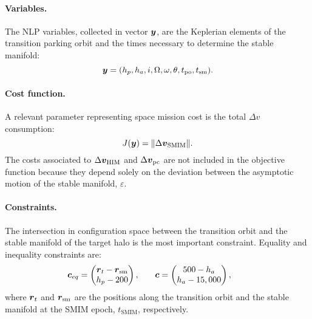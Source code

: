 \paragraph{Variables.}The {NLP} variables, collected in vector $\boldsymbol{y}$, are the Keplerian elements of the transition parking orbit and the times necessary to determine the stable manifold:
%
\begin{equation}
\boldsymbol{y} = (h_p,h_a,i,\Omega,\omega,\theta,t_{\textrm{po}},t_{\textrm{sm}}).
\end{equation}
%

\paragraph{Cost function.} A relevant parameter representing space mission cost is the total $\Delta v$ consumption:
%
\begin{equation}
J(\boldsymbol{y}) = \|\Delta\boldsymbol{v}_{\textrm{SMIM}}\|.
\end{equation}
%
The costs associated to $\Delta\boldsymbol{v}_{\textrm{HIM}}$ and $\Delta\boldsymbol{v}_{\textrm{pc}}$ are not included in the objective function because they depend solely on the deviation between the asymptotic motion of the stable manifold, \ie $\varepsilon$.

\paragraph{Constraints.} 
The intersection in configuration space between the transition orbit and the stable manifold of the target halo is the most important constraint. Equality and inequality constraints are:
%
\begin{align}
&\begin{aligned}
\boldsymbol{c}_{eq} &= \begin{pmatrix}
\boldsymbol{r}_t-\boldsymbol{r}_{\textrm{sm}} \\
h_p-200
\end{pmatrix},
\end{aligned}
&
&\begin{aligned}
\boldsymbol{c} &= \begin{pmatrix}
500-h_a \\
h_a-15,000
\end{pmatrix},
\end{aligned}
\end{align}
%
where $\boldsymbol{r}_t$ and $\boldsymbol{r}_{\textrm{sm}}$ are the positions along the transition orbit and the stable manifold at the SMIM epoch, $t_{\textrm{SMIM}}$, respectively.
%
